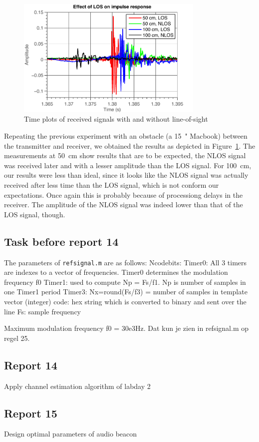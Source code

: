 \documentclass[11pt,titlepage]{report}
\begin{document}
\begin{figure}[H]
	\centering
	\includegraphics[width=0.8\textwidth]{resource/ass-1-report-13-los-nlos.pdf}
	\caption{Time plots of received signals with and without line-of-sight}
	\label{fig:rep13-nlos}
\end{figure}

Repeating the previous experiment with an obstacle (a \SI{15}{"} Macbook) between the transmitter and receiver, we obtained the results as depicted in Figure~\ref{fig:rep13-nlos}. The measurements at \SI{50}{cm} show results that are to be expected, the NLOS signal was received later and with a lesser amplitude than the LOS signal. For \SI{100}{cm}, our results were less than ideal, since it looks like the NLOS signal was actually received after less time than the LOS signal, which is not conform our expectations. Once again this is probably because of processiong delays in the receiver. The amplitude of the NLOS signal was indeed lower than that of the LOS signal, though.


\subsection{Task before report 14}
The parameters of \texttt{refsignal.m} are as follows:
Ncodebits: 
Timer0: All 3 timers are indexes to a vector of frequencies. Timer0 determines the modulation frequency f0
Timer1: used to compute Np = Fs/f1. Np is number of samples in one Timer1 period
Timer3: Nx=round(Fs/f3) = number of samples in template vector (integer)
code: hex string which is converted to binary and sent over the line
Fs: sample frequency

Maximum modulation frequency f0 = 30e3Hz. Dat kun je zien in refsignal.m op regel 25.



\subsection{Report 14}
Apply channel estimation algorithm of labday 2

\subsection{Report 15}
Design optimal parameters of audio beacon
\end{document}
